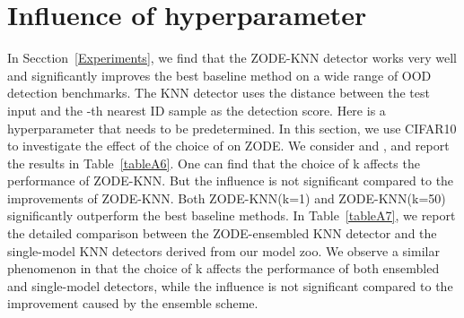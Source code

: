 \documentclass{article} \usepackage{iclr2023_conference,times}
\begin{document}
\section{Influence of hyperparameter}



In Secction~\ref{Experiments},  we find that the ZODE-KNN detector works very well and significantly improves the best baseline method on a wide range of OOD detection benchmarks.
The KNN detector \citep{sun2022knn} uses the distance between the test input and the -th nearest ID sample as the detection score.
Here  is a hyperparameter that needs to be predetermined.
In this section, we use CIFAR10 to investigate the effect of the choice of  on ZODE.
We consider  and , and report the results in Table~\ref{tableA6}. 
One can find that the choice of k affects the performance of ZODE-KNN.
But the influence is not significant compared to the improvements of ZODE-KNN. Both ZODE-KNN(k=1) and ZODE-KNN(k=50) significantly outperform the best baseline methods.
In Table~\ref{tableA7}, we report the detailed comparison between the ZODE-ensembled KNN detector and the single-model KNN detectors derived from our model zoo.
We observe a similar phenomenon in that the choice of k affects the performance of both ensembled and single-model detectors, while the influence is not significant compared to the improvement caused by the ensemble scheme.
\end{document}
